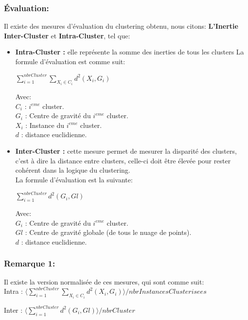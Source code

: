 \documentclass[12pt,a4paper,oneside]{book}
\begin{document}
\subsubsection*{Évaluation:}
Il existe des mesures d'évaluation du clustering obtenu, nous citons: \textbf{L'Inertie Inter-Cluster} et \textbf{Intra-Cluster}, tel que:
\begin{itemize}
	\item \textbf{Intra-Cluster :} elle représente la somme des inerties de tous les clusters 
	La formule d'évaluation est comme suit:
	\begin{center}
		$\sum_{i=1}^{nbrCluster} \sum_{X_i \in C_i} d^{2}(X_i , G_i) $
	\end{center}
	Avec:\\
	$C_i$ : $i^{eme}$ cluster.\\
	$G_i$ : Centre de gravité du $i^{eme}$ cluster.\\
	$X_i$ : Instance du $i^{eme}$ cluster.\\
	$d$ : distance euclidienne.\\
	
	
	\item \textbf{Inter-Cluster :} cette mesure permet de mesurer la disparité des clusters, c'est à dire la distance entre clusters, celle-ci doit être élevée pour rester cohérent dans la logique du clustering.\\
	La formule d'évaluation est la suivante:
	\begin{center}
		$\sum_{i=1}^{nbrCluster} d^{2}(G_i , Gl) $
	\end{center} 
	Avec:\\
	$G_i$ : Centre de gravité du $i^{eme}$ cluster.\\
	$Gl$ : Centre de gravité globale (de tous le nuage de points).\\
	$d$ : distance euclidienne.
	
\end{itemize} 

\subsubsection*{Remarque 1:}
Il existe la version normalisée de ces mesures, qui sont comme suit:\\

Intra : 
$ \langle\sum_{i=1}^{nbrCluster} \sum_{X_i \in C_i} d^{2}(X_i , G_i) \rangle / nbrInstancesClusterisees$

\vspace{0.5cm}
Inter : 
$\langle\sum_{i=1}^{nbrCluster} d^{2}(G_i , Gl) \rangle /  nbrCluster$
\end{document}
